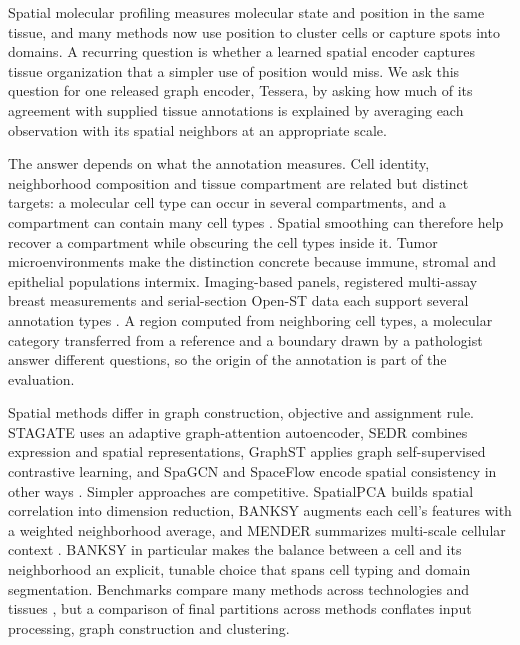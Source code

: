 
Spatial molecular profiling measures molecular state and position in the same tissue, and many methods now use position to cluster cells or capture spots into domains. A recurring question is whether a learned spatial encoder captures tissue organization that a simpler use of position would miss. We ask this question for one released graph encoder, Tessera, by asking how much of its agreement with supplied tissue annotations is explained by averaging each observation with its spatial neighbors at an appropriate scale.

The answer depends on what the annotation measures. Cell identity, neighborhood composition and tissue compartment are related but distinct targets: a molecular cell type can occur in several compartments, and a compartment can contain many cell types \citep{moses2022museum,rao2021architecture}. Spatial smoothing can therefore help recover a compartment while obscuring the cell types inside it. Tumor microenvironments make the distinction concrete because immune, stromal and epithelial populations intermix. Imaging-based panels, registered multi-assay breast measurements and serial-section Open-ST data each support several annotation types \citep{he2022cosmx,janesick2023breast,schott2024openst}. A region computed from neighboring cell types, a molecular category transferred from a reference and a boundary drawn by a pathologist answer different questions, so the origin of the annotation is part of the evaluation.

Spatial methods differ in graph construction, objective and assignment rule. STAGATE uses an adaptive graph-attention autoencoder, SEDR combines expression and spatial representations, GraphST applies graph self-supervised contrastive learning, and SpaGCN and SpaceFlow encode spatial consistency in other ways \citep{dong2022stagate,xu2024sedr,long2023graphst,hu2021spagcn,ren2022spaceflow}. Simpler approaches are competitive. SpatialPCA builds spatial correlation into dimension reduction, BANKSY augments each cell's features with a weighted neighborhood average, and MENDER summarizes multi-scale cellular context \citep{shang2022spatialpca,singhal2024banksy,yuan2024mender}. BANKSY in particular makes the balance between a cell and its neighborhood an explicit, tunable choice that spans cell typing and domain segmentation. Benchmarks compare many methods across technologies and tissues \citep{yuan2024benchmark,kang2025nar,chen2025imeta}, but a comparison of final partitions across methods conflates input processing, graph construction and clustering.

